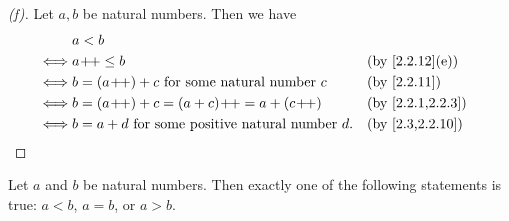 \begin{proof}[(f)]
  Let \(a, b\) be natural numbers.
  Then we have
  \begin{align*}
         & a < b                                                                        \\
    \iff & a\pp \leq b                                            &  & \by{2.2.12}[e]   \\
    \iff & b = (a\pp) + c \text{ for some natural number } c      &  & \by{2.2.11}      \\
    \iff & b = (a\pp) + c = (a + c)\pp = a + (c\pp)               &  & \by{2.2.1,2.2.3} \\
    \iff & b = a + d \text{ for some positive natural number } d. &  & \by{2.3,2.2.10}
  \end{align*}
\end{proof}

\begin{prop}\label{2.2.13}
  Let \(a\) and \(b\) be natural numbers.
  Then exactly one of the following statements is true: \(a < b\), \(a = b\), or \(a > b\).
\end{prop}

